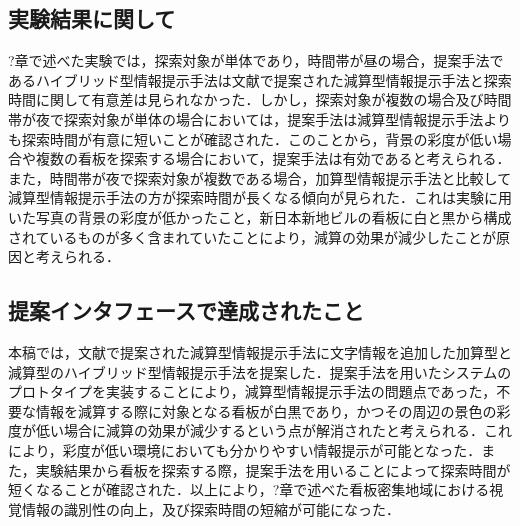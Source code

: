 \subsection{実験結果に関して}
  ?章で述べた実験では，探索対象が単体であり，時間帯が昼の場合，提案手法であるハイブリッド型情報提示手法は文献\cite{Fujita:2013}で提案された減算型情報提示手法と探索時間に関して有意差は見られなかった．しかし，探索対象が複数の場合及び時間帯が夜で探索対象が単体の場合においては，提案手法は減算型情報提示手法よりも探索時間が有意に短いことが確認された．このことから，背景の彩度が低い場合や複数の看板を探索する場合において，提案手法は有効であると考えられる．また，時間帯が夜で探索対象が複数である場合，加算型情報提示手法と比較して減算型情報提示手法の方が探索時間が長くなる傾向が見られた．これは実験に用いた写真の背景の彩度が低かったこと，新日本新地ビルの看板に白と黒から構成されているものが多く含まれていたことにより，減算の効果が減少したことが原因と考えられる．
\subsection{提案インタフェースで達成されたこと}
  本稿では，文献\cite{Fujita:2013}で提案された減算型情報提示手法に文字情報を追加した加算型と減算型のハイブリッド型情報提示手法を提案した．提案手法を用いたシステムのプロトタイプを実装することにより，減算型情報提示手法の問題点であった，不要な情報を減算する際に対象となる看板が白黒であり，かつその周辺の景色の彩度が低い場合に減算の効果が減少するという点が解消されたと考えられる．これにより，彩度が低い環境においても分かりやすい情報提示が可能となった．また，実験結果から看板を探索する際，提案手法を用いることによって探索時間が短くなることが確認された．以上により，?章で述べた看板密集地域における視覚情報の識別性の向上，及び探索時間の短縮が可能になった．
